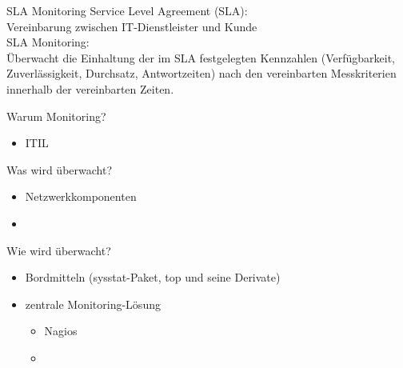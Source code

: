 \documentclass[12pt]{beamer}
\begin{document}
\begin{frame}{SLA Monitoring}
	Service Level Agreement (SLA):\\
	
	Vereinbarung zwischen IT-Dienstleister und Kunde\\
	
	SLA Monitoring:\\
	
	Überwacht die Einhaltung der im SLA festgelegten Kennzahlen (Verfügbarkeit, Zuverlässigkeit, Durchsatz, Antwortzeiten) nach den vereinbarten Messkriterien innerhalb der vereinbarten Zeiten.
\end{frame}
\begin{frame}{Warum Monitoring?}
	\begin{itemize}
		\item ITIL
		
	\end{itemize}
\end{frame}
\begin{frame}{Was wird überwacht?}
	\begin{center}
		\begin{itemize}
			\item Netzwerkkomponenten
			\item 
		\end{itemize}
	\end{center}
	
	
\end{frame}
\begin{frame}{Wie wird überwacht?}
	\begin{itemize}
		\item Bordmitteln (sysstat-Paket, top und seine Derivate)
		\item zentrale Monitoring-Lösung
		\begin{itemize}
			\item Nagios
			\item 
		\end{itemize}
	\end{itemize}
\end{frame}
\end{document}

